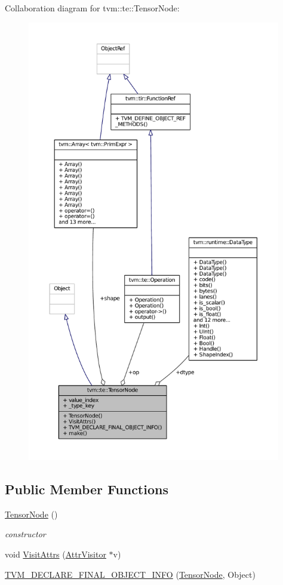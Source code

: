 Collaboration diagram for tvm\+:\+:te\+:\+:Tensor\+Node\+:
\nopagebreak
\begin{figure}[H]
\begin{center}
\leavevmode
\includegraphics[height=550pt]{classtvm_1_1te_1_1TensorNode__coll__graph}
\end{center}
\end{figure}
\subsection*{Public Member Functions}
\begin{DoxyCompactItemize}
\item 
\hyperlink{classtvm_1_1te_1_1TensorNode_a153569448cb1bf9d2924d35639c3b8b8}{Tensor\+Node} ()
\begin{DoxyCompactList}\small\item\em constructor \end{DoxyCompactList}\item 
void \hyperlink{classtvm_1_1te_1_1TensorNode_a206fe89fe8fa50a48434bdafc44872e9}{Visit\+Attrs} (\hyperlink{classtvm_1_1AttrVisitor}{Attr\+Visitor} $\ast$v)
\item 
\hyperlink{classtvm_1_1te_1_1TensorNode_a442e7ed4b4877e72692216af97b3f0b7}{T\+V\+M\+\_\+\+D\+E\+C\+L\+A\+R\+E\+\_\+\+F\+I\+N\+A\+L\+\_\+\+O\+B\+J\+E\+C\+T\+\_\+\+I\+N\+FO} (\hyperlink{classtvm_1_1te_1_1TensorNode}{Tensor\+Node}, Object)
\end{DoxyCompactItemize}
